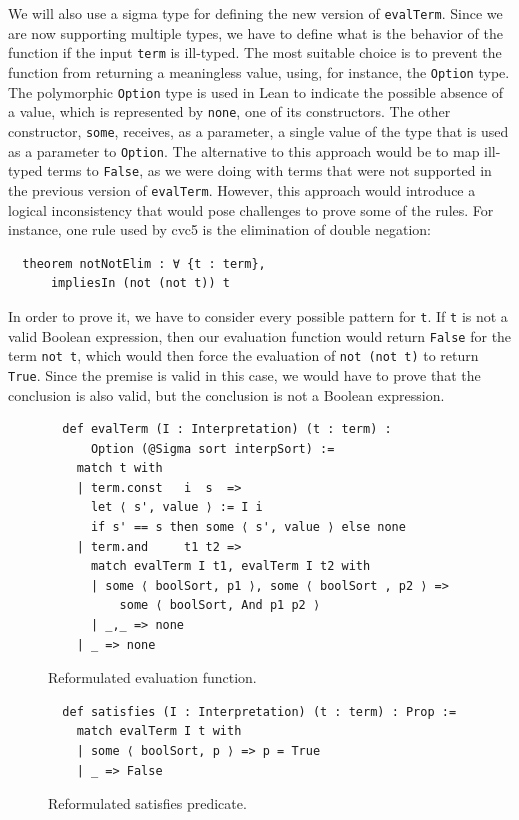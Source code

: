 We will also use a sigma type for defining the new version of \texttt{evalTerm}.
%
Since we are now supporting multiple types, we have to define what is the behavior
of the function if the input \texttt{term} is ill-typed.
The most suitable choice is to prevent the function from returning
a meaningless value, using, for instance, the \texttt{Option} type. The polymorphic
\texttt{Option} type is used in Lean to indicate the possible absence of a value,
which is represented by \texttt{none}, one of its constructors. The other
constructor, \texttt{some}, receives, as a parameter, a single value
of the type that is used as a parameter to \texttt{Option}.
The alternative to this approach would be to map ill-typed
terms to \texttt{False}, as we were doing with terms that were not supported
in the previous version of \texttt{evalTerm}.
However, this approach would introduce
a logical inconsistency that would pose challenges to prove some of the rules.
For instance, one rule used by cvc5 is the elimination of double negation:

\begin{verbatim}
  theorem notNotElim : ∀ {t : term},
      impliesIn (not (not t)) t
\end{verbatim}

In order to prove it, we have to consider every possible pattern for \texttt{t}.
If \texttt{t} is not a valid Boolean expression, then our evaluation function would
return \texttt{False} for the term \texttt{not t}, which would then force the
evaluation of \texttt{not (not t)} to return \texttt{True}. Since the premise
is valid in this case, we would have to prove that the conclusion is also valid,
but the conclusion is not a Boolean expression.


\begin{figure}[t]
\begin{verbatim}
  def evalTerm (I : Interpretation) (t : term) :
      Option (@Sigma sort interpSort) :=
    match t with
    | term.const   i  s  =>
      let ⟨ s', value ⟩ := I i
      if s' == s then some ⟨ s', value ⟩ else none
    | term.and     t1 t2 =>
      match evalTerm I t1, evalTerm I t2 with
      | some ⟨ boolSort, p1 ⟩, some ⟨ boolSort , p2 ⟩ =>
          some ⟨ boolSort, And p1 p2 ⟩
      | _,_ => none
    | _ => none
\end{verbatim}
\caption{Reformulated evaluation function.}\label{evalTerm2}
\end{figure}


\begin{figure}[t]
\begin{verbatim}
  def satisfies (I : Interpretation) (t : term) : Prop :=
    match evalTerm I t with
    | some ⟨ boolSort, p ⟩ => p = True
    | _ => False
\end{verbatim}
\caption{Reformulated satisfies predicate.}\label{satisfiesPred}
\end{figure}

